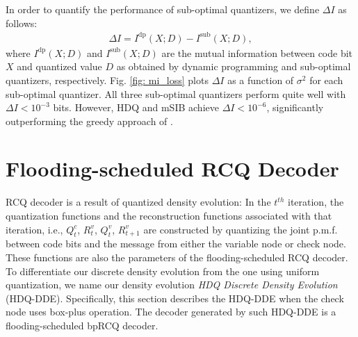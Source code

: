\documentclass [PhD] {uclathes}
\begin{document}
In order to quantify the performance of sub-optimal quantizers, we define $\Delta I$ as follows:
\begin{align}
    \Delta I = I^{\text{dp}}(X;D)-I^{\text{sub}}(X;D),
\end{align}
where $I^{\text{dp}}(X;D)$ and $I^{\text{sub}}(X;D)$ are the mutual information between code bit $X$ and quantized value $D$ as obtained by dynamic programming and sub-optimal quantizers, respectively. Fig. \ref{fig: mi_loss} plots $\Delta I$ as a function of $\sigma^2$ for each sub-optimal quantizer.  All three sub-optimal quantizers perform quite well with $\Delta I < 10^{-3}$ bits.  However, HDQ and mSIB achieve  $\Delta I < 10^{-6}$, significantly outperforming the greedy approach of \cite{Tal2011-QuanVardy}.

\section{Flooding-scheduled RCQ Decoder}\label{sec: MIM-DDE}
RCQ decoder is a result of quantized density evolution: In the $t^{th}$ iteration, the quantization functions and the reconstruction functions associated with that iteration, i.e., $Q^c_{t}$, $R^v_t$, $Q^v_t$, $R^v_{t+1}$ are constructed by quantizing the joint p.m.f. between code bits and the message from either the variable node or check node. These functions are also the parameters of the flooding-scheduled RCQ decoder.  To differentiate our discrete density evolution from the one using uniform quantization\cite{Sae-Young_Chung2001-DDE0045}, we name our density evolution \textit{HDQ Discrete Density Evolution} (HDQ-DDE).  Specifically, this section describes the HDQ-DDE when the check node uses box-plus operation. The decoder generated by such HDQ-DDE is a flooding-scheduled bpRCQ decoder.
\end{document}
